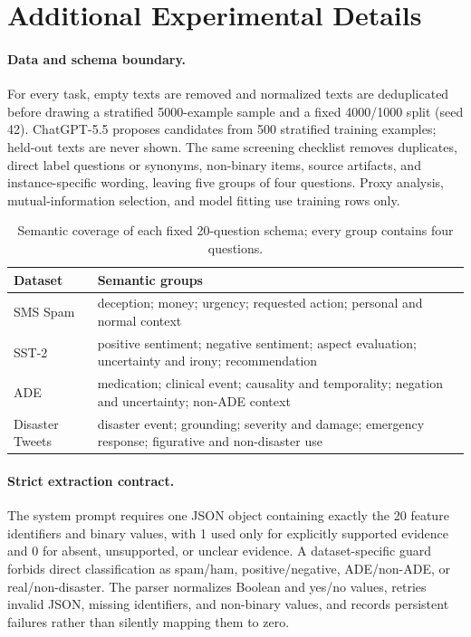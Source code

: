 \section{Additional Experimental Details}
\label{app:reproducibility}

\paragraph{Data and schema boundary.}
For every task, empty texts are removed and normalized texts are deduplicated before drawing a stratified 5000-example sample and a fixed 4000/1000 split (seed 42). ChatGPT-5.5 proposes candidates from 500 stratified training examples; held-out texts are never shown. The same screening checklist removes duplicates, direct label questions or synonyms, non-binary items, source artifacts, and instance-specific wording, leaving five groups of four questions. Proxy analysis, mutual-information selection, and model fitting use training rows only.

\begin{table}[!htbp]
\centering
\caption{Semantic coverage of each fixed 20-question schema; every group contains four questions.}
\label{tab:compact-schema-groups}
\small
\setlength{\tabcolsep}{4pt}
\begin{tabular}{@{}L{2.2cm}L{9.0cm}@{}}
\toprule
Dataset & Semantic groups \\
\midrule
SMS Spam & deception; money; urgency; requested action; personal and normal context \\
SST-2 & positive sentiment; negative sentiment; aspect evaluation; uncertainty and irony; recommendation \\
ADE & medication; clinical event; causality and temporality; negation and uncertainty; non-ADE context \\
Disaster Tweets & disaster event; grounding; severity and damage; emergency response; figurative and non-disaster use \\
\bottomrule
\end{tabular}
\end{table}

\paragraph{Strict extraction contract.}
The system prompt requires one JSON object containing exactly the 20 feature identifiers and binary values, with 1 used only for explicitly supported evidence and 0 for absent, unsupported, or unclear evidence. A dataset-specific guard forbids direct classification as spam/ham, positive/negative, ADE/non-ADE, or real/non-disaster. The parser normalizes Boolean and yes/no values, retries invalid JSON, missing identifiers, and non-binary values, and records persistent failures rather than silently mapping them to zero.

